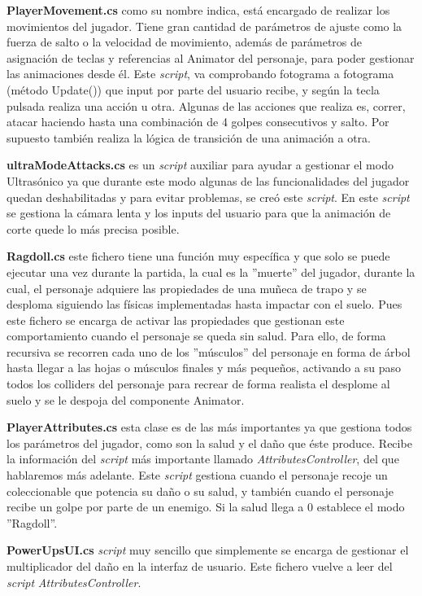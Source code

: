 \textbf{PlayerMovement.cs} como su nombre indica, está encargado de realizar los movimientos del jugador. Tiene gran cantidad de parámetros de ajuste como la fuerza de salto o la velocidad de movimiento, además de parámetros de asignación de teclas y referencias al Animator del personaje, para poder gestionar las animaciones desde él. Este \textit{script}, va comprobando fotograma a fotograma (método Update()) que input por parte del usuario recibe, y según la tecla pulsada realiza una acción u otra. Algunas de las acciones que realiza es, correr, atacar haciendo hasta una combinación de 4 golpes consecutivos y salto. Por supuesto también realiza la lógica de transición de una animación a otra.

\textbf{ultraModeAttacks.cs} es un \textit{script} auxiliar para ayudar a gestionar el modo Ultrasónico ya que durante este modo algunas de las funcionalidades del jugador quedan deshabilitadas y para evitar problemas, se creó este \textit{script}. En este \textit{script} se gestiona la cámara lenta y los inputs del usuario para que la animación de corte quede lo más precisa posible.

\textbf{Ragdoll.cs} este fichero tiene una función muy específica y que solo se puede ejecutar una vez durante la partida, la cual es la ''muerte'' del jugador, durante la cual, el personaje adquiere las propiedades de una muñeca de trapo y se desploma siguiendo las físicas implementadas hasta impactar con el suelo. Pues este fichero se encarga de activar las propiedades que gestionan este comportamiento cuando el personaje se queda sin salud. Para ello, de forma recursiva se recorren cada uno de los ''músculos'' del personaje en forma de árbol hasta llegar a las hojas o músculos finales y más pequeños, activando a su paso todos los colliders del personaje para recrear de forma realista el desplome al suelo y se le despoja del componente Animator.

\textbf{PlayerAttributes.cs} esta clase es de las más importantes ya que gestiona todos los parámetros del jugador, como son la salud y el daño que éste produce. Recibe la información del \textit{script} más importante llamado \textit{AttributesController}, del que hablaremos más adelante. Este \textit{script} gestiona cuando el personaje recoje un coleccionable que potencia su daño o su salud, y también cuando el personaje recibe un golpe por parte de un enemigo. Si la salud llega a 0 establece el modo ''Ragdoll''.

\textbf{PowerUpsUI.cs} \textit{script} muy sencillo que simplemente se encarga de gestionar el multiplicador del daño en la interfaz de usuario. Este fichero vuelve a leer del \textit{script} \textit{AttributesController}.

